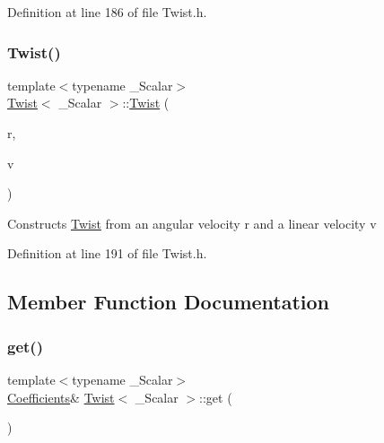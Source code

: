 Definition at line 186 of file Twist.\+h.

\hypertarget{class_twist_a6be65e5ed24f7aa0b2ac0261aa111292}{}\label{class_twist_a6be65e5ed24f7aa0b2ac0261aa111292} 
\subsubsection{\texorpdfstring{Twist()}{Twist()}\hspace{0.1cm}{\footnotesize\ttfamily [7/7]}}
{\footnotesize\ttfamily template$<$typename \+\_\+\+Scalar$>$ \\
\hyperlink{class_twist}{Twist}$<$ \+\_\+\+Scalar $>$\+::\hyperlink{class_twist}{Twist} (\begin{DoxyParamCaption}\item[{const typename \hyperlink{class_twist_base_ad0bc13debe8afc170da877cebe4dc45f}{Base\+::\+Angular\+Velocity} \&}]{r,  }\item[{const typename \hyperlink{class_twist_base_aeafbc7a3ca37e08812be0af7e680190b}{Base\+::\+Linear\+Velocity} \&}]{v }\end{DoxyParamCaption})\hspace{0.3cm}{\ttfamily [inline]}}

Constructs \hyperlink{class_twist}{Twist} from an angular velocity {\ttfamily r} and a linear velocity {\ttfamily v} 

Definition at line 191 of file Twist.\+h.



\subsection{Member Function Documentation}
\hypertarget{class_twist_ac1f779976c880605099c319bc9749c2c}{}\label{class_twist_ac1f779976c880605099c319bc9749c2c} 
\subsubsection{\texorpdfstring{get()}{get()}\hspace{0.1cm}{\footnotesize\ttfamily [1/2]}}
{\footnotesize\ttfamily template$<$typename \+\_\+\+Scalar$>$ \\
\hyperlink{class_twist_a1bc0976a0f06b366421639350134222b}{Coefficients}\& \hyperlink{class_twist}{Twist}$<$ \+\_\+\+Scalar $>$\+::get (\begin{DoxyParamCaption}{ }\end{DoxyParamCaption})\hspace{0.3cm}{\ttfamily [inline]}}


